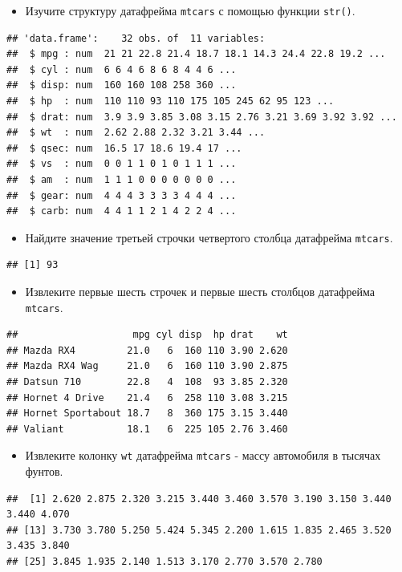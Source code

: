 \documentclass[]{book}
\providecommand{\tightlist}{%
  \setlength{\itemsep}{0pt}\setlength{\parskip}{0pt}}
\begin{document}
\begin{itemize}
\tightlist
\item
  Изучите структуру датафрейма \texttt{mtcars} с помощью функции
  \texttt{str()}.
\end{itemize}

\begin{verbatim}
## 'data.frame':    32 obs. of  11 variables:
##  $ mpg : num  21 21 22.8 21.4 18.7 18.1 14.3 24.4 22.8 19.2 ...
##  $ cyl : num  6 6 4 6 8 6 8 4 4 6 ...
##  $ disp: num  160 160 108 258 360 ...
##  $ hp  : num  110 110 93 110 175 105 245 62 95 123 ...
##  $ drat: num  3.9 3.9 3.85 3.08 3.15 2.76 3.21 3.69 3.92 3.92 ...
##  $ wt  : num  2.62 2.88 2.32 3.21 3.44 ...
##  $ qsec: num  16.5 17 18.6 19.4 17 ...
##  $ vs  : num  0 0 1 1 0 1 0 1 1 1 ...
##  $ am  : num  1 1 1 0 0 0 0 0 0 0 ...
##  $ gear: num  4 4 4 3 3 3 3 4 4 4 ...
##  $ carb: num  4 4 1 1 2 1 4 2 2 4 ...
\end{verbatim}

\begin{itemize}
\tightlist
\item
  Найдите значение третьей строчки четвертого столбца датафрейма
  \texttt{mtcars}.
\end{itemize}

\begin{verbatim}
## [1] 93
\end{verbatim}

\begin{itemize}
\tightlist
\item
  Извлеките первые шесть строчек и первые шесть столбцов датафрейма
  \texttt{mtcars}.
\end{itemize}

\begin{verbatim}
##                    mpg cyl disp  hp drat    wt
## Mazda RX4         21.0   6  160 110 3.90 2.620
## Mazda RX4 Wag     21.0   6  160 110 3.90 2.875
## Datsun 710        22.8   4  108  93 3.85 2.320
## Hornet 4 Drive    21.4   6  258 110 3.08 3.215
## Hornet Sportabout 18.7   8  360 175 3.15 3.440
## Valiant           18.1   6  225 105 2.76 3.460
\end{verbatim}

\begin{itemize}
\tightlist
\item
  Извлеките колонку \texttt{wt} датафрейма \texttt{mtcars} - массу
  автомобиля в тысячах фунтов.
\end{itemize}

\begin{verbatim}
##  [1] 2.620 2.875 2.320 3.215 3.440 3.460 3.570 3.190 3.150 3.440 3.440 4.070
## [13] 3.730 3.780 5.250 5.424 5.345 2.200 1.615 1.835 2.465 3.520 3.435 3.840
## [25] 3.845 1.935 2.140 1.513 3.170 2.770 3.570 2.780
\end{verbatim}
\end{document}
